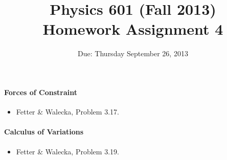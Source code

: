 \documentclass[letterpaper,11pt]{article}
\title{Physics 601 (Fall 2013) \\ Homework Assignment 4}
\date{Due: Thursday September 26, 2013}
\begin{document}
\maketitle

\paragraph*{Forces of Constraint}
\begin{itemize}
 \item Fetter \& Walecka, Problem 3.17.
\end{itemize}

\paragraph*{Calculus of Variations}
\begin{itemize}
 \item Fetter \& Walecka, Problem 3.19.
\end{itemize}
\end{document}
